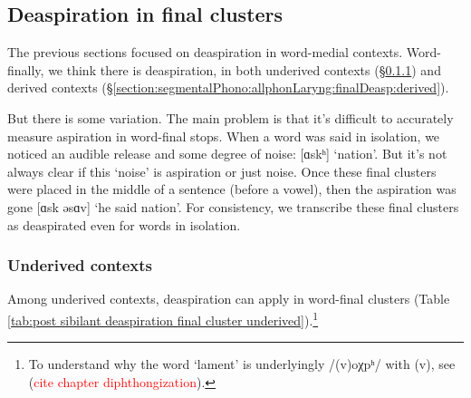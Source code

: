   
  
  \subsection{Deaspiration in final clusters}\label{section:segmentalPhono:allphonLaryng:finalDeasp}
  The previous sections focused on deaspiration in word-medial contexts. Word-finally, we think there is deaspiration, in both underived contexts (\S\ref{section:segmentalPhono:allphonLaryng:finalDeasp:underived}) and derived contexts (\S\ref{section:segmentalPhono:allphonLaryng:finalDeasp:derived}).
  
  But there is some variation. The main problem is that it's difficult to accurately measure aspiration in word-final stops. When a word was said in isolation, we noticed an audible release and some degree of noise: [ɑskʰ] `nation'. But it's not always clear if this `noise' is aspiration or just noise. Once these final clusters were placed in the middle of a sentence (before a vowel), then the aspiration was gone [ɑsk əsɑv] `he said nation'. For consistency, we transcribe these final clusters as deaspirated even for words in isolation. 
  
  \subsubsection{Underived contexts}\label{section:segmentalPhono:allphonLaryng:finalDeasp:underived}
  Among underived contexts, deaspiration can apply in word-final clusters (Table \ref{tab:post sibilant deaspiration final cluster underived}).\footnote{To understand why the word `lament' is underlyingly /(v)oχpʰ/ with (v), see (\textcolor{red}{cite chapter diphthongization}).} 
  
